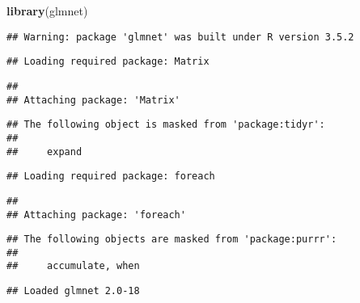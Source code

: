 \documentclass[]{article}
\newenvironment{Shaded}{\begin{snugshade}}{\end{snugshade}}
\newcommand{\KeywordTok}[1]{\textcolor[rgb]{0.13,0.29,0.53}{\textbf{{#1}}}}
\newcommand{\DataTypeTok}[1]{\textcolor[rgb]{0.13,0.29,0.53}{{#1}}}
\newcommand{\DecValTok}[1]{\textcolor[rgb]{0.00,0.00,0.81}{{#1}}}
\newcommand{\StringTok}[1]{\textcolor[rgb]{0.31,0.60,0.02}{{#1}}}
\newcommand{\NormalTok}[1]{{#1}}
\begin{document}
\begin{Shaded}
\begin{Highlighting}[]
\KeywordTok{library}\NormalTok{(glmnet)}
\end{Highlighting}
\end{Shaded}

\begin{verbatim}
## Warning: package 'glmnet' was built under R version 3.5.2
\end{verbatim}

\begin{verbatim}
## Loading required package: Matrix
\end{verbatim}

\begin{verbatim}
## 
## Attaching package: 'Matrix'
\end{verbatim}

\begin{verbatim}
## The following object is masked from 'package:tidyr':
## 
##     expand
\end{verbatim}

\begin{verbatim}
## Loading required package: foreach
\end{verbatim}

\begin{verbatim}
## 
## Attaching package: 'foreach'
\end{verbatim}

\begin{verbatim}
## The following objects are masked from 'package:purrr':
## 
##     accumulate, when
\end{verbatim}

\begin{verbatim}
## Loaded glmnet 2.0-18
\end{verbatim}

\begin{Shaded}
\end{Shaded}
\end{document}
